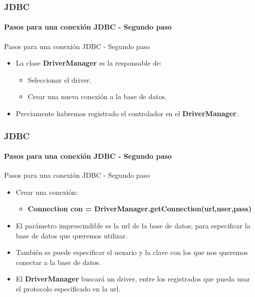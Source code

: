 \documentclass{beamer}
\begin{document}
	\begin{frame}
		\frametitle{JDBC}
		\framesubtitle{Pasos para una conexi\'on JDBC - Segundo paso}

        \begin{exampleblock}{Pasos para una conexi\'on JDBC - Segundo paso}
		    \begin{itemize}
		        \item La clase \textbf{DriverManager} es la responsable de:
		        \begin{itemize}
		            \item Seleccionar el driver.
		            \item Crear una nueva conexi\'on a la base de datos.
		        \end{itemize}
		        \item Previamente habremos registrado el controlador en el \textbf{DriverManager}.
		    \end{itemize}
		    \end{exampleblock}
	\end{frame}

	\begin{frame}
		\frametitle{JDBC}
		\framesubtitle{Pasos para una conexi\'on JDBC - Segundo paso}

        \begin{exampleblock}{Pasos para una conexi\'on JDBC - Segundo paso}
		    \begin{itemize}
		        \item Crear una conexi\'on:
		        \begin{itemize}
		            \item \textbf{Connection con = DriverManager.getConnection(url,user,pass)}
		        \end{itemize}
		        \item El par\'ametro imprescindible es la url de la base de datos; para especificar la base de datos que queremos utilizar.
		        \item Tambi\'en se puede especificar el usuario y la clave con los que nos queremos conectar a la base de datos.
		        \item El \textbf{DriverManager} buscar\'a un driver, entre los registrados que pueda usar el protocolo especificado en la url.
		    \end{itemize}
		    \end{exampleblock}
	\end{frame}
\end{document}
